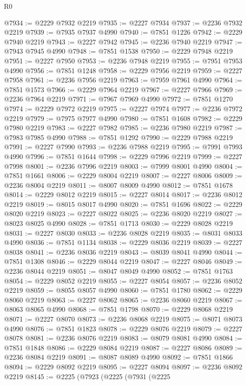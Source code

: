 \begin{lexlean}{R0}
\begin{coremodule}
@7934 := @2229 @7932 @2219
@7935 := @2227 @7934
@7937 := @2236 @7932 @2219
@7939 := @7935 @7937 @4990
@7940 := @7851 @1226
@7942 := @2229 @7940 @2219
@7943 := @2227 @7942
@7945 := @2236 @7940 @2219
@7947 := @7943 @7945 @4990
@7948 := @7851 @1538
@7950 := @2229 @7948 @2219
@7951 := @2227 @7950
@7953 := @2236 @7948 @2219
@7955 := @7951 @7953 @4990
@7956 := @7851 @1248
@7958 := @2229 @7956 @2219
@7959 := @2227 @7958
@7961 := @2236 @7956 @2219
@7963 := @7959 @7961 @4990
@7964 := @7851 @1573
@7966 := @2229 @7964 @2219
@7967 := @2227 @7966
@7969 := @2236 @7964 @2219
@7971 := @7967 @7969 @4990
@7972 := @7851 @1270
@7974 := @2229 @7972 @2219
@7975 := @2227 @7974
@7977 := @2236 @7972 @2219
@7979 := @7975 @7977 @4990
@7980 := @7851 @1608
@7982 := @2229 @7980 @2219
@7983 := @2227 @7982
@7985 := @2236 @7980 @2219
@7987 := @7983 @7985 @4990
@7988 := @7851 @1292
@7990 := @2229 @7988 @2219
@7991 := @2227 @7990
@7993 := @2236 @7988 @2219
@7995 := @7991 @7993 @4990
@7996 := @7851 @1644
@7998 := @2229 @7996 @2219
@7999 := @2227 @7998
@8001 := @2236 @7996 @2219
@8003 := @7999 @8001 @4990
@8004 := @7851 @1661
@8006 := @2229 @8004 @2219
@8007 := @2227 @8006
@8009 := @2236 @8004 @2219
@8011 := @8007 @8009 @4990
@8012 := @7851 @1678
@8014 := @2229 @8012 @2219
@8015 := @2227 @8014
@8017 := @2236 @8012 @2219
@8019 := @8015 @8017 @4990
@8020 := @7851 @1696
@8022 := @2229 @8020 @2219
@8023 := @2227 @8022
@8025 := @2236 @8020 @2219
@8027 := @8023 @8025 @4990
@8028 := @7851 @1713
@8030 := @2229 @8028 @2219
@8031 := @2227 @8030
@8033 := @2236 @8028 @2219
@8035 := @8031 @8033 @4990
@8036 := @7851 @1134
@8038 := @2229 @8036 @2219
@8039 := @2227 @8038
@8041 := @2236 @8036 @2219
@8043 := @8039 @8041 @4990
@8044 := @7851 @1308
@8046 := @2229 @8044 @2219
@8047 := @2227 @8046
@8049 := @2236 @8044 @2219
@8051 := @8047 @8049 @4990
@8052 := @7851 @1763
@8054 := @2229 @8052 @2219
@8055 := @2227 @8054
@8057 := @2236 @8052 @2219
@8059 := @8055 @8057 @4990
@8060 := @7851 @1780
@8062 := @2229 @8060 @2219
@8063 := @2227 @8062
@8065 := @2236 @8060 @2219
@8067 := @8063 @8065 @4990
@8068 := @7851 @1798
@8070 := @2229 @8068 @2219
@8071 := @2227 @8070
@8073 := @2236 @8068 @2219
@8075 := @8071 @8073 @4990
@8076 := @7851 @1823
@8078 := @2229 @8076 @2219
@8079 := @2227 @8078
@8081 := @2236 @8076 @2219
@8083 := @8079 @8081 @4990
@8084 := @7851 @1848
@8086 := @2229 @8084 @2219
@8087 := @2227 @8086
@8089 := @2236 @8084 @2219
@8091 := @8087 @8089 @4990
@8092 := @7851 @1866
@8094 := @2229 @8092 @2219
@8095 := @2227 @8094
@8097 := @2236 @8092 @2219
@8145 := @2225
    (@7923
      (@2225
        (@7931
          (@2225

\end{coremodule}
\end{lexlean}
